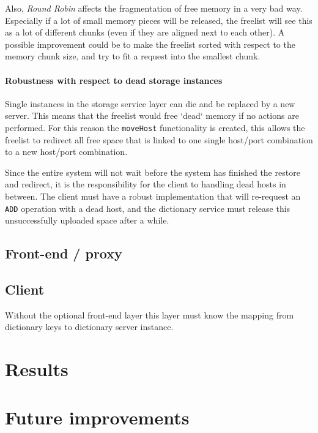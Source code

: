\documentclass[12pt,a4paper]{scrartcl}
\begin{document}
Also, \emph{Round Robin} affects the fragmentation of free memory in a very bad way. Especially if a lot of small memory pieces will be released, the freelist will see this as a lot of different chunks (even if they are aligned next to each other). A possible improvement could be to make the freelist sorted with respect to the memory chunk size, and try to fit a request into the smallest chunk.

\paragraph{Robustness with respect to dead storage instances}
Single instances in the storage service layer can die and be replaced by a new server. This means that the freelist would free `dead` memory if no actions are performed. For this reason the \verb|moveHost| functionality is created, this allows the freelist to redirect all free space that is linked to one single host/port combination to a new host/port combination.

Since the entire system will not wait before the system has finished the restore and redirect, it is the responsibility for the client to handling dead hosts in between. The client must have a robust implementation that will re-request an \verb|ADD| operation with a dead host, and the dictionary service must release this unsuccessfully uploaded space after a while.

\subsection{Front-end / proxy}
\subsection{Client}
Without the optional front-end layer this layer must know the mapping from dictionary keys to dictionary server instance.

\section{Results}

\section{Future improvements}
\end{document}
